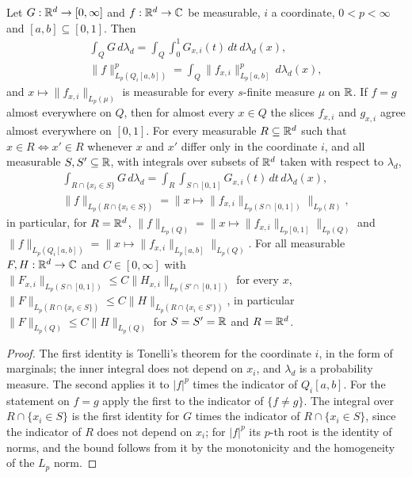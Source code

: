 \begin{lemma}
\label{lem:cube-slices}
\leanok
{}
Let $G : \mathbb{R}^d \to [0, \infty]$ and $f : \mathbb{R}^d \to \mathbb{C}$ be measurable, $i$ a coordinate,
$0 < p < \infty$ and $[a, b] \subseteq [0, 1]$. Then
\begin{gather*}
  \int_Q G \, d\lambda_d = \int_Q \int_0^1 G_{x,i}(t) \, dt \, d\lambda_d(x) , \\
  \|f\|_{L_p(Q_i[a,b])}^p = \int_Q \|f_{x,i}\|_{L_p[a,b]}^p \, d\lambda_d(x) ,
\end{gather*}
and $x \mapsto \|f_{x,i}\|_{L_p(\mu)}$ is measurable for every $s$-finite measure $\mu$ on $\mathbb{R}$.
If $f = g$ almost everywhere on $Q$, then for almost every $x \in Q$ the slices $f_{x,i}$ and
$g_{x,i}$ agree almost everywhere on $[0, 1]$. For every measurable $R \subseteq \mathbb{R}^d$ such that
$x \in R \Leftrightarrow x' \in R$ whenever $x$ and $x'$ differ only in the coordinate $i$, and
all measurable $S, S' \subseteq \mathbb{R}$, with integrals over subsets of $\mathbb{R}^d$ taken with respect to
$\lambda_d$,
\begin{gather*}
  \int_{R \cap \{x_i \in S\}} G \, d\lambda_d
  = \int_R \int_{S \cap [0, 1]} G_{x,i}(t) \, dt \, d\lambda_d(x) , \\
  \|f\|_{L_p(R \cap \{x_i \in S\})} = \bigl\| x \mapsto \|f_{x,i}\|_{L_p(S \cap [0, 1])}
  \bigr\|_{L_p(R)} ,
\end{gather*}
in particular, for $R = \mathbb{R}^d$, $\|f\|_{L_p(Q)} = \| x \mapsto \|f_{x,i}\|_{L_p[0,1]} \|_{L_p(Q)}$
and $\|f\|_{L_p(Q_i[a,b])} = \| x \mapsto \|f_{x,i}\|_{L_p[a,b]} \|_{L_p(Q)}$. For all measurable
$F, H : \mathbb{R}^d \to \mathbb{C}$ and $C \in [0, \infty]$ with
$\|F_{x,i}\|_{L_p(S \cap [0,1])} \leq C \|H_{x,i}\|_{L_p(S' \cap [0,1])}$ for every $x$,
$\|F\|_{L_p(R \cap \{x_i \in S\})} \leq C \|H\|_{L_p(R \cap \{x_i \in S'\})}$, in particular
$\|F\|_{L_p(Q)} \leq C \|H\|_{L_p(Q)}$ for $S = S' = \mathbb{R}$ and $R = \mathbb{R}^d$.
\end{lemma}

\begin{proof}
\leanok
The first identity is Tonelli's theorem for the coordinate $i$, in the form of marginals; the
inner integral does not depend on $x_i$, and $\lambda_d$ is a probability measure. The second
applies it to $|f|^p$ times the indicator of $Q_i[a, b]$. For the statement on $f = g$ apply the
first to the indicator of $\{f \neq g\}$. The integral over $R \cap \{x_i \in S\}$ is the first
identity for $G$ times the indicator of $R \cap \{x_i \in S\}$, since the indicator of $R$ does
not depend on $x_i$; for $|f|^p$ its $p$-th root is the identity of norms, and the bound follows
from it by the monotonicity and the homogeneity of the $L_p$ norm.
\end{proof}

